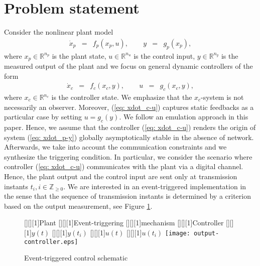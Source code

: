 \documentclass[a4paper, 9pt, twocolumn]{IEEEtran}
\theoremstyle{plain}
\theoremstyle{definition}
\newcommand{\R}[2]{\ensuremath{\mathbb{R}^{#1}_{#2}}}
\newcommand{\Zp}{\ensuremath{\mathbb{Z}_{\geq 0}}}
\begin{document}
\section{Problem statement} \label{sec: problem-statement}
Consider the nonlinear plant model
\begin{equation} \label{eq: xdot_p-y}
\begin{array}{lllll}
  \dot{x}_{p} &=& f_{p}(x_{p},u), \hspace{25pt} y &=& g_{p}(x_{p}),
\end{array}
\end{equation}
where $x_{p} \in \R{n_{p}}{}$ is the plant state, $u \in \R{n_{u}}{}$ is the control input, $y\in\R{n_{y}}{}$ is the measured output of the plant and we focus on general dynamic controllers of the form
\begin{equation}\label{eq: xdot_c-u}
\begin{array}{lllll}
  \dot{x}_{c} &=& f_{c}(x_{c}, y), \hspace{25pt}  u &=& g_{c}(x_{c}, y),
\end{array}
\end{equation}
where $x_{c} \in \R{n_{c}}{}$ is the controller state. We emphasize that the $x_{c}$-system is not necessarily an observer. Moreover, (\ref{eq: xdot_c-u}) captures static feedbacks as a particular case by setting $u=g_{c}(y)$. We follow an emulation approach in this paper. Hence, we assume that the controller (\ref{eq: xdot_c-u}) renders the origin of system (\ref{eq: xdot_p-y}) globally asymptotically stable in the absence of network. Afterwards, we take into account the communication constraints and we synthesize the triggering condition. In particular, we consider the scenario where controller (\ref{eq: xdot_c-u}) communicates with the plant via a digital channel. Hence, the plant output and the control input are sent only at transmission instants $t_{i}, i\in \Zp$. We are interested in an event-triggered implementation in the sense that the sequence of transmission instants is determined by a criterion based on the output measurement, see Figure \ref{fig:output-controller}.
\begin{figure}[h!]
\centering \scriptsize
{}[][][1]{Plant}
[][][1]{Event-triggering}
[][][1]{mechanism}
[][][1]{Controller}
[][][1]{$y(t)$}
[][][1]{$y(t_{i})$}
[][][1]{$u(t)$}
[][][1]{$u(t_{i})$}
\texttt{[image: output-controller.eps]}
\caption{Event-triggered control schematic \cite{Donkers2012output}}\label{fig:output-controller}
\end{figure}
\end{document}
